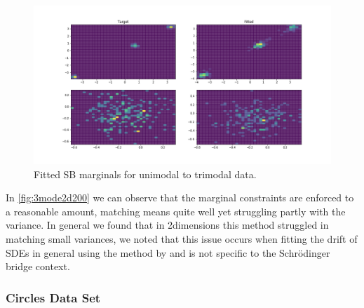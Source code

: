 \documentclass[a4paper,12pt,twoside,openright]{report}
\theoremstyle{definition}
\begin{document}
\begin{figure}
    \centering
    \includegraphics[scale=0.4,trim={2.3cm 1cm 2.5cm 0}, clip]{images/GP/2d_3mode_GP_means_3.3_3.6_0.7_std_0.1_hist_200.png}
    \caption{ Fitted SB marginals for unimodal to trimodal data.  }
    \label{fig:3mode2d200hist}
\end{figure}
In \ref{fig:3mode2d200} we can observe that the marginal constraints are enforced to a reasonable amount, matching means quite well yet struggling partly with the variance. In general we found that in 2dimensions this method struggled in matching small variances, we noted that this issue occurs when fitting the drift of SDEs in general using the method by \cite{ruttor2013approximate} and is not specific to the Schrödinger bridge context.

\subsubsection{Circles Data Set}
\end{document}

